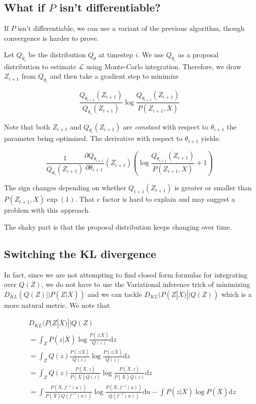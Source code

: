 \documentclass{article}
\begin{document}
\subsection{What if \(P\) isn't differentiable?}

If \(P\) isn't differentiable, we can use a variant of the previous algorithm,
though convergence is harder to prove.

Let \(Q_{\theta_i}\) be the distribution \(Q_{\theta}\) at timestep \(i\).
We use \(Q_{\theta_i}\) as a proposal distribution to estimate \(\mathcal{L}\)
using Monte-Carlo integration. Therefore, we draw \(Z_{i+1}\) from
\(Q_{\theta_i}\) and then take a gradient step to minimize

\[
  \frac{Q_{\theta_{i+1}}(Z_{i+1})}{Q_{\theta_i}(Z_{i+1})} \log
  \frac{Q_{\theta_{i+1}}(Z_{i+1})}{P(Z_{i+1},X)}
\]

Note that both \(Z_{i+1}\) and \(Q_{\theta_i}(Z_{i+1})\) are \emph{constant}
with respect to \(\theta_{i+1}\) the parameter being optimized. The derivative
with respect to \(\theta_{i+1}\) yields:

\[
  \frac{1}{Q_{\theta_i}(Z_{i+1})}
    \frac{\partial Q_{\theta_{i+1}}}{\partial \theta_{i+1}}(Z_{i+1})
    \left( \log \frac{Q_{\theta_{i+1}}(Z_{i+1})}{P(Z_{i+1},X)} + 1 \right)
\]

The sign changes depending on whether \(Q_{t+1}(Z_{t+1})\) is greater or
smaller than \(P(Z_{t+1},X) \exp(1)\). That \(e\) factor is hard
to explain and may suggest a problem with this approach.

The shaky part is that the proposal distribution keeps changing over time.

\subsection{Switching the KL divergence}

In fact, since we are not attempting to find closed form formulas for
integrating over \(Q(Z)\), we do not have to use the Variational inference
trick of minimizing \(D_{KL}(Q(Z)||P(Z|\overline{X}))\) and we can tackle
\(D_{KL}(P(Z|\overline{X})||Q(Z))\) which is a more natural metric. We note that

\[
\begin{aligned}
  & D_{KL}(P(Z|\overline{X})|| Q(Z) \\
  &= \int_Z P(z|\overline{X}) \log \frac{P(z|\overline{X})}{Q(z)} \mathrm{d}z \\
  &= \int_Z Q(z) \frac{P(z|\overline{X})}{Q(z)}
  \log \frac{P(z|\overline{X})}{Q(z)}  \mathrm{d}z \\
  &= \int_Z Q(z) \frac{P(\overline{X}, z)}{P(\overline{X})Q(z)}
  \log \frac{P(\overline{X}, z)}{P(\overline{X})Q(z)}  \mathrm{d}z \\
  &= \int\frac{P(\overline{X}, f^{-1}(u))}{
    P(\overline{X})Q(f^{-1}(u))}
  \log \frac{P(\overline{X}, f^{-1}(u))}{Q(f^{-1}(u))}  \mathrm{d}u
  - \int P(z|\overline{X}) \log P(\overline{X})  \mathrm{d}z
\end{aligned}
\]
\end{document}
